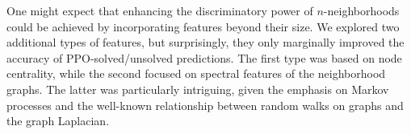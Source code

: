 \medskip

One might expect that enhancing the discriminatory power of \(n\)-neighborhoods could be achieved by incorporating features beyond their size.
We explored two additional types of features, but surprisingly, they only marginally improved the accuracy of PPO-solved/unsolved predictions.
The first type was based on node centrality, while the second focused on spectral features of the neighborhood graphs.
The latter was particularly intriguing, given the emphasis on Markov processes and the well-known relationship between random walks on graphs and the graph Laplacian.
